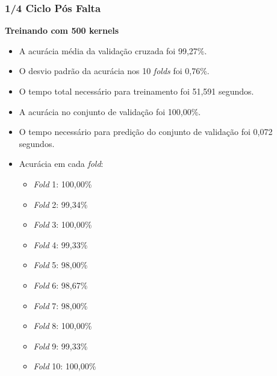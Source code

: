 \subsubsection{1/4 Ciclo Pós Falta}
\textbf{Treinando com 500 kernels}
\begin{itemize}
    \item A acurácia média da validação cruzada foi 99,27\%.
    \item O desvio padrão da acurácia nos 10 \textit{folds} foi 0,76\%.
    \item O tempo total necessário para treinamento foi 51,591 segundos.
    \item A acurácia no conjunto de validação foi 100,00\%.
    \item O tempo necessário para predição do conjunto de validação foi 0,072 segundos.
    \item Acurácia em cada \textit{fold}:
    \begin{itemize}
        \item \textit{Fold} 1: 100,00\%
        \item \textit{Fold} 2: 99,34\%
        \item \textit{Fold} 3: 100,00\%
        \item \textit{Fold} 4: 99,33\%
        \item \textit{Fold} 5: 98,00\%
        \item \textit{Fold} 6: 98,67\%
        \item \textit{Fold} 7: 98,00\%
        \item \textit{Fold} 8: 100,00\%
        \item \textit{Fold} 9: 99,33\%
        \item \textit{Fold} 10: 100,00\%
    \end{itemize}
\end{itemize}

